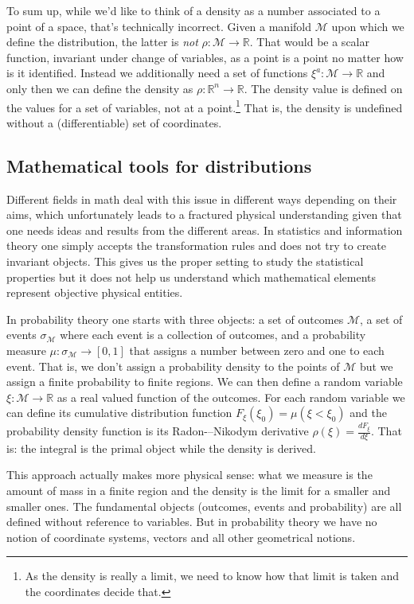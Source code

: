 \documentclass[11pt]{article}
\begin{document}
To sum up, while we'd like to think of a density as a number associated to a point of a space, that's technically incorrect. Given a manifold $\mathcal{M}$ upon which we define the distribution, the latter is \emph{not} $\rho : \mathcal{M} \to \mathbb{R}$. That would be a scalar function, invariant under change of variables, as a point is a point no matter how is it identified. Instead we additionally need a set of functions $\xi^a : \mathcal{M} \to \mathbb{R}$ and only then we can define the density as $\rho : \mathbb{R}^n \to \mathbb{R}$. The density value is defined on the values for a set of variables, not at a point.\footnote{As the density is really a limit, we need to know how that limit is taken and the coordinates decide that.} That is, the density is undefined without a (differentiable) set of coordinates.

\subsection*{Mathematical tools for distributions}

Different fields in math deal with this issue in different ways depending on their aims, which unfortunately leads to a fractured physical understanding given that one needs ideas and results from the different areas. In statistics and information theory one simply accepts the transformation rules and does not try to create invariant objects. This gives us the proper setting to study the statistical properties but it does not help us understand which mathematical elements represent objective physical entities.

In probability theory one starts with three objects: a set of outcomes $\mathcal{M}$, a set of events $\sigma_\mathcal{M}$ where each event is a collection of outcomes, and a probability measure $\mu : \sigma_\mathcal{M} \rightarrow [0,1]$ that assigns a number between zero and one to each event. That is, we don't assign a probability density to the points of $\mathcal{M}$ but we assign a finite probability to finite regions. We can then define a random variable $\xi : \mathcal{M} \rightarrow \mathbb{R}$ as a real valued function of the outcomes. For each random variable we can define its cumulative distribution function $F_\xi(\xi_0)=\mu(\xi<\xi_0)$ and the probability density function is its Radon-–Nikodym derivative $\rho(\xi) = \frac{dF_\xi}{d\xi}$. That is: the integral is the primal object while the density is derived.

This approach actually makes more physical sense: what we measure is the amount of mass in a finite region and the density is the limit for a smaller and smaller ones. The fundamental objects (outcomes, events and probability) are all defined without reference to variables. But in probability theory we have no notion of coordinate systems, vectors and all other geometrical notions.
\end{document}
